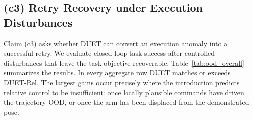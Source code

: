 \documentclass[letterpaper, 10 pt, conference]{ieeeconf}
\begin{document}
\begin{table}[t]
\caption{Nominal task success (\%) on LIBERO. External rows are reported results and are included only for benchmark context. StarVLA uses joint $30$k training; DUET uses suite-specific $10$k checkpoints.}
\label{tab:benchmark}
\centering
{}
\end{table}


\subsection{(c3) Retry Recovery under Execution Disturbances}
Claim (c3) asks whether DUET can convert an execution anomaly into a successful retry. We evaluate closed-loop task success after controlled disturbances that leave the task objective recoverable. Table~\ref{tab:ood_overall} summarizes the results. In every aggregate row DUET matches or exceeds DUET-Rel. The largest gains occur precisely where the introduction predicts relative control to be insufficient: once locally plausible commands have driven the trajectory OOD, or once the arm has been displaced from the demonstrated pose.

\begin{table}[t]
\caption{Closed-loop task success under matched execution-failure protocols. Each row uses only the stated scope.}
\label{tab:ood_overall}
\centering
{}
\end{table}
\end{document}
